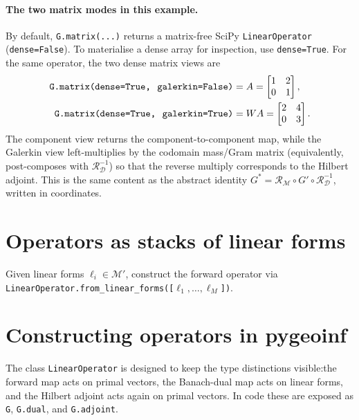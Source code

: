 \documentclass[11pt,twoside,openright]{book}
\theoremstyle{plain}
\theoremstyle{definition}
\theoremstyle{remark}
\newcommand{\modelspace}{\mathcal{M}}
\newcommand{\dataspace}{\mathcal{D}}
\newcommand{\Riesz}{\mathcal{R}}
\begin{document}
\paragraph{The two matrix modes in this example.}
By default, \texttt{G.matrix(...)} returns a matrix-free SciPy
\texttt{LinearOperator} (\texttt{dense=False}). To materialise a dense
array for inspection, use \texttt{dense=True}. For the same operator,
the two dense matrix views are
\begin{align}
  \texttt{G.matrix(dense=True,\, galerkin=False)} &= A
  = \begin{bmatrix} 1 & 2 \\ 0 & 1 \end{bmatrix},\\
  \texttt{G.matrix(dense=True,\, galerkin=True)}  &= W A
  = \begin{bmatrix} 2 & 4 \\ 0 & 3 \end{bmatrix}.
\end{align}
The component view returns the component-to-component map, while the Galerkin
view left-multiplies by the codomain mass/Gram matrix (equivalently,
post-composes with $\Riesz_{\dataspace}^{-1}$) so that the reverse
multiply corresponds to the Hilbert adjoint. This is the same content as the
abstract identity $G^* = \Riesz_{\modelspace} \circ G' \circ \Riesz_{\dataspace}^{-1}$,
written in coordinates.

\section{Operators as stacks of linear forms}
\label{sec:operator-from-forms}

\begin{codebox}
Given linear forms $\ell_i \in \modelspace'$, construct the forward operator via
\texttt{LinearOperator.from\_linear\_forms([$\ell_1, \ldots, \ell_M$])}.
\end{codebox}

\section{Constructing operators in pygeoinf}
\label{sec:constructing-operators}

The class \texttt{LinearOperator} is designed to keep the type distinctions
visible:\;the forward map acts on primal vectors,
the Banach-dual map acts on linear forms, and the Hilbert adjoint acts again on
primal vectors. In code these are exposed as \texttt{G}, \texttt{G.dual}, and
\texttt{G.adjoint}.
\end{document}
